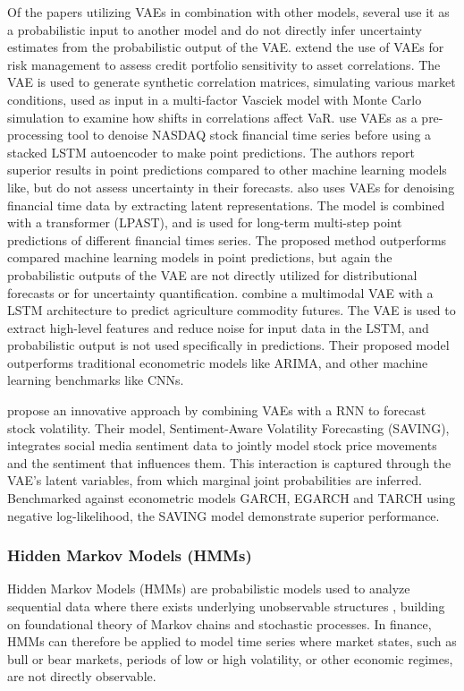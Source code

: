 Of the papers utilizing VAEs in combination with other models, several use it as a probabilistic input to another model and do not directly infer uncertainty estimates from the probabilistic output of the VAE.  
\textcite{caprioli2023quantifying} extend the use of VAEs for risk management to assess credit portfolio sensitivity to asset correlations. The VAE is used to generate synthetic correlation matrices, simulating various market conditions, used as input in a multi-factor Vasciek model with Monte Carlo simulation to examine how shifts in correlations affect VaR. \textcite{choudhury2020enhancing} use VAEs as a pre-processing tool to denoise NASDAQ stock financial time series before using a stacked LSTM autoencoder to make point predictions. The authors report superior results in point predictions compared to other machine learning models like, but do not assess uncertainty in their forecasts.  \textcite{tang2024period} also uses VAEs for denoising financial time data by extracting latent representations. The model is combined with a transformer (LPAST), and is used for long-term multi-step point predictions of different financial times series. The proposed method outperforms compared machine learning models in point predictions, but again the probabilistic outputs of the VAE are not directly utilized for distributional forecasts or for uncertainty quantification. \textcite{li2020multivariate} combine a multimodal VAE with a LSTM architecture to predict agriculture commodity futures. The VAE is used to extract high-level features and reduce noise for input data in the LSTM, and probabilistic output is not used specifically in predictions. Their proposed model outperforms traditional econometric models like ARIMA, and other machine learning benchmarks like CNNs. 

\textcite{xing2019sentiment} propose an innovative approach by combining VAEs with a RNN to forecast stock volatility. Their model, Sentiment-Aware Volatility Forecasting (SAVING), integrates social media sentiment data to jointly model stock price movements and the sentiment that influences them. This interaction is captured through the VAE's latent variables, from which marginal joint probabilities are inferred. Benchmarked against econometric models GARCH, EGARCH and TARCH using negative log-likelihood, the SAVING model demonstrate superior performance.


\subsubsection{Hidden Markov Models (HMMs)}
Hidden Markov Models (HMMs) are probabilistic models used to analyze sequential data where there exists underlying unobservable structures \parencite{rabiner1986introduction}, building on foundational theory of Markov chains and stochastic processes. In finance, HMMs can therefore be applied to model time series where market states, such as bull or bear markets, periods of low or high volatility, or other economic regimes, are not directly observable. 

